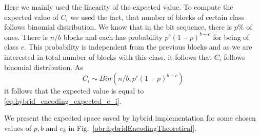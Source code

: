 Here we mainly used the linearity of the expected value. To compute the expected value of
$C_i$ we used the fact, that number of blocks of certain class follows binomial
distribution. We know that in the bit sequence, there is $p\%$ of ones. There is $n/b$ blocks
and each has probability $p^c(1-p)^{b-c}$ for being of class $c$. This probability is independent
from the previous blocks and as we are interested in total number of blocks with this class,
it follows that $C_i$ follows binomial distribution. As $$C_i \sim Bin(n/b, p^c(1-p)^{b-c})$$
it follows that the expected value is equal to \ref{eq:hybrid_encoding_expected_c_i}.

We present the expected space saved by hybrid implementation for some chosen values of
$p, b$ and $c_k$ in Fig.~\ref{obr:hybridEncodingTheoretical}.

